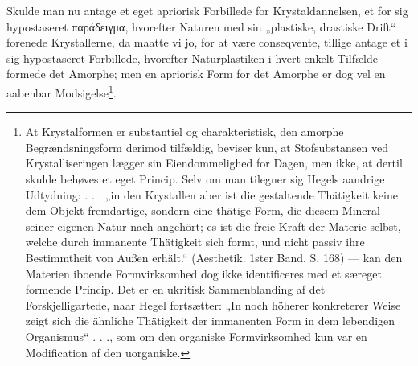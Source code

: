 \documentclass[12pt,a4paper]{book}
\begin{document}
Skulde man nu antage et eget apriorisk Forbillede for Krystaldannelsen,
et for sig hypostaseret παράδειγμα, hvorefter Naturen med sin „plastiske,
drastiske Drift“ forenede Krystallerne, da maatte vi jo, for at være
conseqvente, tillige antage et i sig hypostaseret Forbillede, hvorefter
Naturplastiken i hvert enkelt Tilfælde formede det Amorphe; men en
apriorisk Form for det Amorphe er dog vel en aabenbar
Modsigelse\footnote{At Krystalformen er substantiel og charakteristisk,
den amorphe Begrændsningsform derimod tilfældig, beviser kun, at
Stofsubstansen ved Krystalliseringen lægger sin Eiendommelighed for
Dagen, men ikke, at dertil skulde behøves et eget Princip. Selv om man
tilegner sig Hegels aandrige Udtydning: . . . „in den Krystallen aber ist
die gestaltende Thätigkeit keine dem Objekt fremdartige, sondern eine
thätige Form, die diesem Mineral seiner eigenen Natur nach angehört; es
ist die freie Kraft der Materie selbst, welche durch immanente
Thätigkeit sich formt, und nicht passiv ihre Bestimmtheit von Außen
erhält.“ (Aesthetik. 1ster Band. S. 168) --- kan den Materien iboende
Formvirksomhed dog ikke identificeres med et særeget formende Princip.
Det er en ukritisk Sammenblanding af det Forskjelligartede, naar Hegel
fortsætter: „In noch höherer konkreterer Weise zeigt sich die ähnliche
Thätigkeit der immanenten Form in dem lebendigen Organismus“ . . ., som
om den organiske Formvirksomhed kun var en Modification af den
uorganiske.}.
\end{document}
